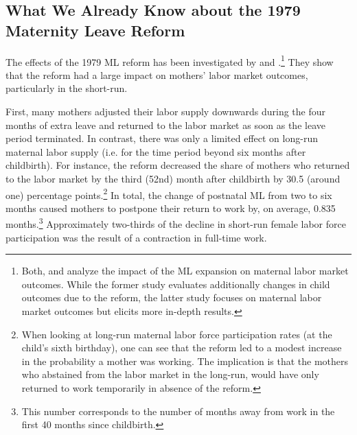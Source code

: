 \documentclass[11pt, a4paper, draft]{article} %
\begin{document}



\bigskip
\subsection{What We Already Know about the 1979 Maternity Leave Reform}
The effects of the 1979 ML reform has been investigated by \cite{Dustmann2012} and \cite{schonberg2014expansions}.\footnote{Both, \cite{Dustmann2012} and \cite{schonberg2014expansions} analyze the impact of the ML expansion on maternal labor market outcomes. While the former study evaluates additionally changes in child outcomes due to the reform, the latter study focuses on maternal labor market outcomes but elicits more in-depth results.} They show that the reform had a large impact on mothers' labor market outcomes, particularly in the short-run. 


First, many mothers adjusted their labor supply downwards during the four months of extra leave and returned to the labor market as soon as the leave period terminated. In contrast, there was only a limited effect on long-run maternal labor supply (i.e. for the time period beyond six months after childbirth). For instance, the reform decreased the share of mothers who returned to the labor market by the third (52nd) month after childbirth by 30.5 (around one) percentage points.\footnote{When looking at long-run maternal labor force participation rates (at the child's sixth birthday), one can see that the reform led to a modest increase in the probability a mother was working. The implication is that the mothers who abstained from the labor market in the long-run, would have only returned to work temporarily in absence of the reform.}
In total, the change of postnatal ML from two to six months caused mothers to postpone their return to work by, on average, 0.835 months.\footnote{This number corresponds to the number of months away from work in the first 40 months since childbirth.} Approximately two-thirds of the decline in short-run female labor force participation was the result of a contraction in full-time work. 
\end{document}

